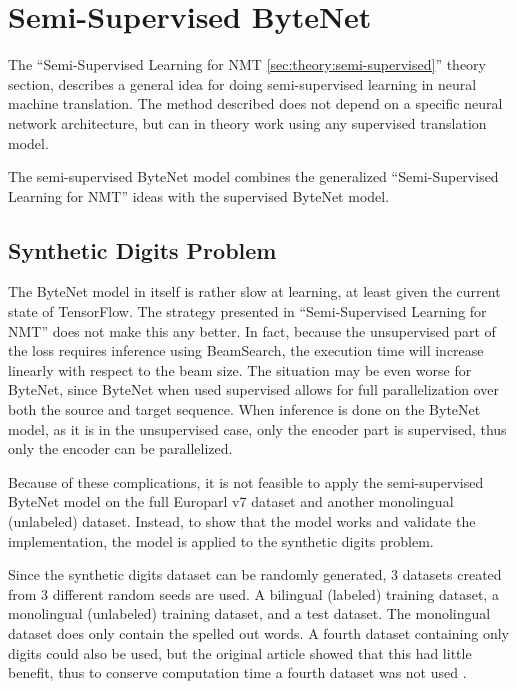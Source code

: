 
\section{Semi-Supervised ByteNet}

The ``Semi-Supervised Learning for NMT \ref{sec:theory:semi-supervised}'' theory section, describes a general idea for doing semi-supervised learning in neural machine translation. The method described does not depend on a specific neural network architecture, but can in theory work using any supervised translation model.

The semi-supervised ByteNet model combines the generalized ``Semi-Supervised Learning for NMT'' ideas with the supervised ByteNet model.

\subsection{Synthetic Digits Problem}

The ByteNet model in itself is rather slow at learning, at least given the current state of TensorFlow. The strategy presented in ``Semi-Supervised Learning for NMT'' does not make this any better. In fact, because the unsupervised part of the loss requires inference using BeamSearch, the execution time will increase linearly with respect to the beam size. The situation may be even worse for ByteNet, since ByteNet when used supervised allows for full parallelization over both the source and target sequence. When inference is done on the ByteNet model, as it is in the unsupervised case, only the encoder part is supervised, thus only the encoder can be parallelized.

Because of these complications, it is not feasible to apply the semi-supervised ByteNet model on the full Europarl v7 dataset and another monolingual (unlabeled) dataset. Instead, to show that the model works and validate the implementation, the model is applied to the synthetic digits problem.

Since the synthetic digits dataset can be randomly generated, 3 datasets created from 3 different random seeds are used. A bilingual (labeled) training dataset, a monolingual (unlabeled) training dataset, and a test dataset. The monolingual dataset does only contain the spelled out words. A fourth dataset containing only digits could also be used, but the original article showed that this had little benefit, thus to conserve computation time a fourth dataset was not used \cite{semi-supervised}.

